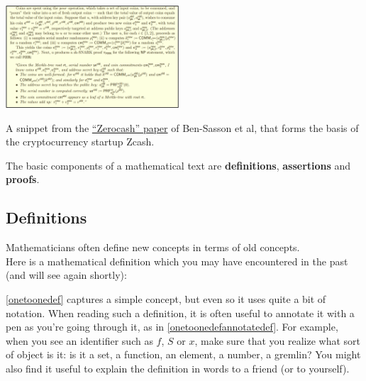 \begin{marginfigure}
\centering
\includegraphics[width=\linewidth, height=1.5in, keepaspectratio]{../figure/zerocash.png}
\caption{A snippet from the
\href{http://zerocash-project.org/paper}{``Zerocash'' paper} of
Ben-Sasson et al, that forms the basis of the cryptocurrency startup
Zcash.}
\label{zerocashfig}
\end{marginfigure}

The basic components of a mathematical text are \textbf{definitions},
\textbf{assertions} and \textbf{proofs}.

\subsection{Definitions}\label{Definitions}

Mathematicians often define new concepts in terms of old concepts.\\
Here is a mathematical definition which you may have encountered in the
past (and will see again shortly):

\hypertarget{onetoonedef}{}

\cref{onetoonedef} captures a simple concept, but even so it uses quite
a bit of notation. When reading such a definition, it is often useful to
annotate it with a pen as you're going through it, as in
\cref{onetoonedefannotatedef}. For example, when you see an identifier
such as \(f\), \(S\) or \(x\), make sure that you realize what sort of
object is it: is it a set, a function, an element, a number, a gremlin?
You might also find it useful to explain the definition in words to a
friend (or to yourself).


